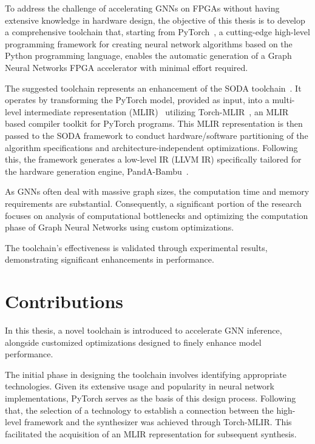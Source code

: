 To address the challenge of accelerating GNNs on FPGAs without having extensive knowledge in hardware design, the objective of this thesis is to develop a comprehensive toolchain that, starting from PyTorch~\cite{DBLP:journals/corr/abs-1912-01703},
a cutting-edge high-level programming framework for creating neural network algorithms based on the Python programming language, enables the
automatic generation of a Graph Neural Networks FPGA accelerator with minimal effort required.

The suggested toolchain represents an enhancement of the SODA toolchain~\cite{9786533}.
It operates by transforming the PyTorch model, provided as input, into a multi-level intermediate representation
(MLIR)~\cite{9370308} utilizing Torch-MLIR~\cite{torch_mlir}, an MLIR based compiler toolkit for PyTorch programs.
This MLIR representation is then passed to the SODA framework to conduct hardware/software partitioning of the algorithm
specifications and architecture-independent optimizations.
Following this, the framework generates a low-level IR (LLVM IR) specifically tailored for the hardware generation engine,
PandA-Bambu~\cite{9586110}.

As GNNs often deal with massive graph sizes, the computation time and memory requirements are substantial.
Consequently, a significant portion of the research focuses on analysis of computational bottlenecks and optimizing the computation phase of Graph Neural Networks using
custom optimizations.

The toolchain's effectiveness is validated through experimental results, demonstrating significant enhancements in performance.

\section{Contributions}
\label{sec:contributions}%

In this thesis, a novel toolchain is introduced to accelerate GNN inference, alongside customized optimizations designed to finely enhance model performance.

The initial phase in designing the toolchain involves identifying appropriate technologies.
Given its extensive usage and popularity in neural network implementations, PyTorch serves as the basis of this design process.
Following that, the selection of a technology to establish a connection between the high-level framework and the synthesizer was achieved through Torch-MLIR\@.
This facilitated the acquisition of an MLIR representation for subsequent synthesis.

